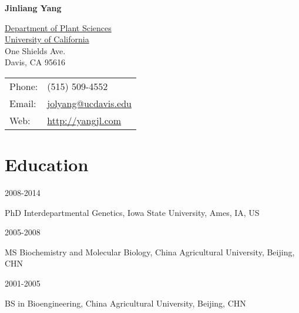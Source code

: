\documentclass[letterpaper]{article}
\def\name{Jinliang Yang}
\begin{document}
\centerline{\huge \bf \name}

\vspace{0.25in}

\begin{minipage}{0.55\linewidth}
  \href{http://www.plantsciences.ucdavis.edu/plantsciences/}{Department of Plant Sciences}\\
  \href{http://www.ucdavis.edu/}{University of California} \\
  One Shields Ave.\\
  Davis, CA 95616 \\
\end{minipage}
\begin{minipage}{0.35\linewidth}
  \begin{tabular}{ll}
    Phone: & (515) 509-4552 \\
    Email: & \href{mailto:jolyang@ucdavis.edu}{jolyang@ucdavis.edu} \\
    Web: & \href{http://yangjl.com}{http://yangjl.com} \\
  \end{tabular}
\end{minipage}


\section*{Education}
\begin{minipage}{0.2\linewidth}
  2008-2014 \\
\end{minipage}
\begin{minipage}{0.7\linewidth}
  PhD Interdepartmental Genetics, Iowa State University, Ames, IA, US \\
\end{minipage}

\begin{minipage}{0.2\linewidth}
  2005-2008 \\
\end{minipage}
\begin{minipage}{0.7\linewidth}
  MS Biochemistry and Molecular Biology, China Agricultural University, Beijing, CHN \\
\end{minipage}

\begin{minipage}{0.2\linewidth}
  2001-2005 \\
\end{minipage}
\begin{minipage}{0.7\linewidth}
  BS in Bioengineering, China Agricultural University, Beijing, CHN \\
\end{minipage}
\end{document}
